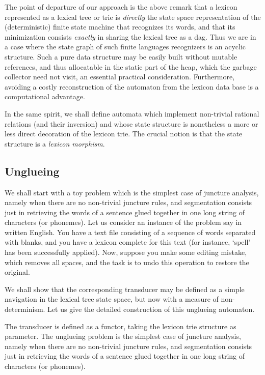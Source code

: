 \documentclass[12pt]{article}
\begin{document}
The point of departure of our approach is the above remark that a lexicon 
represented as a lexical tree or trie is {\sl directly} the state space 
representation of the (deterministic) finite state machine that recognizes 
its words, and that its minimization consists {\sl exactly} in sharing
the lexical tree as a dag. Thus we are in a case where the state graph 
of such finite languages recognizers is an acyclic structure. Such
a pure data structure may be easily built without mutable references, and thus
allocatable in the static part of the heap, which the garbage collector need
not visit, an essential practical consideration. Furthermore, avoiding 
a costly reconstruction of the automaton from the lexicon data base is a 
computational advantage.

In the same spirit, we shall define automata which implement non-trivial 
rational relations (and their inversion) and whose state structure is 
nonetheless a more or less direct decoration of the lexicon trie. The crucial
notion is that the state structure is a {\sl lexicon morphism}.

\subsection{Unglueing}

We shall start with a toy problem which is the simplest case of juncture
analy\-sis, namely when there are no non-trivial juncture rules, and 
segmentation consists just in retrieving the words of a sentence
glued together in one long string of characters (or phonemes). 
Let us consider an instance of
the problem say in written English. You have a text file
consisting of a sequence of words separated with blanks, and you have
a lexicon complete for this text (for instance, `spell' has been successfully
applied). Now, suppose you make some editing mistake, which removes all
spaces, and the task is to undo this operation to restore the original.

We shall show that the corresponding transducer may be defined as a simple
navigation in the lexical tree state space, but now with a measure of
non-determinism. Let us give the detailed construction of this unglueing
automaton. 

The transducer is defined as a functor, taking the lexicon trie structure
as parameter.
\label{../ML/unglue.ml:0}%
The unglueing problem is the simplest case of juncture
analysis, namely when there are no non-trivial juncture rules, and 
segmentation consists just in retrieving the words of a sentence
glued together in one long string of characters (or phonemes). 
\end{document}
